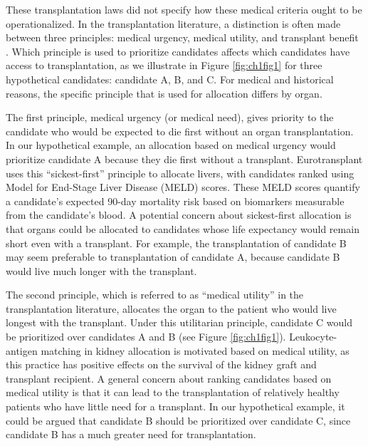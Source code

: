 \documentclass[11pt,twoside,]{book}
\begin{document}
These transplantation laws did not specify how these medical criteria ought to be
operationalized. In the transplantation literature, a distinction is often
made between three principles: medical urgency, medical utility,
and transplant benefit \citep{Schaubel2009}. Which principle is used
to prioritize candidates affects which candidates have access to transplantation,
as we illustrate in Figure \ref{fig:ch1fig1} for three hypothetical candidates:
candidate A, B, and C. For medical and historical reasons, the specific
principle that is used for allocation differs by organ.

The first principle, medical urgency (or medical need), gives priority
to the candidate who would be expected to die first without an organ transplantation.
In our hypothetical example, an allocation based on medical urgency would
prioritize candidate A because they die first without a transplant.
Eurotransplant uses this ``sickest-first'' principle to allocate livers, with
candidates ranked using Model for End-Stage Liver Disease (MELD) scores. These
MELD scores quantify a candidate's expected 90-day mortality risk based on
biomarkers measurable from
the candidate's blood. A potential concern about sickest-first allocation is that
organs could be allocated to candidates whose life expectancy
would remain short even with a transplant. For example, the transplantation of
candidate B may seem preferable to transplantation of candidate A, because
candidate B would live much longer with the transplant.

The second principle, which is referred to as ``medical utility'' in the
transplantation literature, allocates the organ to the patient who would live longest with the
transplant. Under this utilitarian principle, candidate
C would be prioritized over candidates A and B (see Figure \ref{fig:ch1fig1}).
Leukocyte-antigen matching in kidney allocation is motivated based on medical
utility, as this practice has positive effects on the
survival of the kidney graft and transplant recipient. A general concern about
ranking candidates based
on medical utility is that it can lead to the transplantation of relatively healthy
patients who have little need for a transplant. In our hypothetical example,
it could be argued that candidate B should be prioritized over candidate C,
since candidate B has a much greater need for transplantation.
\end{document}
